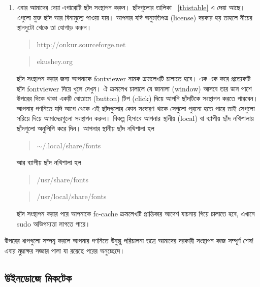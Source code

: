 \documentclass[a4paper,10pt,xetex]{article}
\begin{document}
\begin{enumerate}
\item এবার আমাদের দেয়া এগারোটি ছাঁদ সংস্থাপন করুন। ছাঁদগুলোর তালিকা \tablename~\ref{thistable} এ দেয়া আছে। এগুলো মুক্ত ছাঁদ আর বিনামুল্যে পাওয়া যায়। আপনার যদি অনুমতিপত্র (license) দরকার হয় তাহলে নীচের স্থানদুটো থেকে তা যোগাড় করুন। ‌\begin{quote}http://onkur.sourceforge.net\end{quote}\begin{quote}ekushey.org\end{quote} ছাঁদ সংস্থাপন করার জন্য আপনাকে fontviewer নামক ক্রমলেখটি চালাতে হবে। এক এক করে প্রত্যেকটি ছাঁদ fontviewer দিয়ে খুলে দেখুন। ঐ ক্রমলেখ চালালে যে জানালা (window) আসবে তার ডান পাশে উপরের দিকে থাকা একটি বোতামে (button) টিপ (click) দিয়ে আপনি ছাঁদটিকে সংস্থাপন করতে পারবেন। আপনার গণনিতে যদি আগে থেকে এই ছাঁদগুলোর কোন সংস্করণ থাকে সেগুলো পুরনো হতে পারে তাই সেগুলো সরিয়ে দিয়ে আমাদেরগুলো সংস্থাপন করুন। বিকল্প হিসাবে আপনার স্থানীয় (local) বা ব্যাপীয় ছাঁদ নথিশালায় ছাঁদগুলো অনুলিপি করে দিন। আপনার স্থানীয় ছাঁদ নথিশালা হল  ‌\begin{quote}$\sim$/.local/share/fonts \end{quote} আর ব্যাপীয় ছাঁদ নথিশালা হল ‌\begin{quote}/usr/share/fonts\end{quote} \begin{quote}/usr/local/share/fonts\end{quote} ছাঁদ সংস্থাপন করার পরে আপনাকে fc-cache ক্রমলেখটি প্রান্তিকার আদেশ যাচনায় গিয়ে চালাতে হবে, এখানে sudo অভিগম্যতা লাগতে পারে।
\end{enumerate}

উপরের ধাপগুলো সম্পন্ন করলে আপনার গণনিতে উবুন্তু পরিচালনা তন্ত্রে আমাদের দরকারী সংস্থাপন কাজ সম্পূর্ণ শেষ! এবার মুদ্রাক্ষর সজ্জার পালা যা রয়েছে পরের অনুচ্ছেদে।


\subsection*{উইনডোজে মিকটেক}
\end{document}
